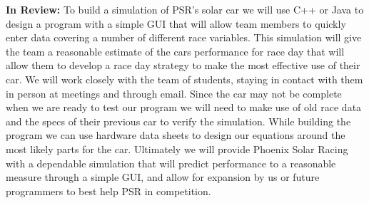 \documentclass[10pt]{IEEEtran}
\begin{document}
\textbf{In Review:}
To build a simulation of PSR's solar car we will use C++ or Java to design a program with a simple GUI that will allow team members to quickly enter data covering a number of different race variables. This simulation will give the team a reasonable estimate of the cars performance for race day that will allow them to develop a race day strategy to make the most effective use of their car. We will work closely with the team of students, staying in contact with them in person at meetings and through email. Since the car may not be complete when we are ready to test our program we will need to make use of old race data and the specs of their previous car to verify the simulation. While building the program we can use hardware data sheets to design our equations around the most likely parts for the car. Ultimately we will provide Phoenix Solar Racing with a dependable simulation that will predict performance to a reasonable measure through a simple GUI, and allow for expansion by us or future programmers to best help PSR in competition.
\end{document}
